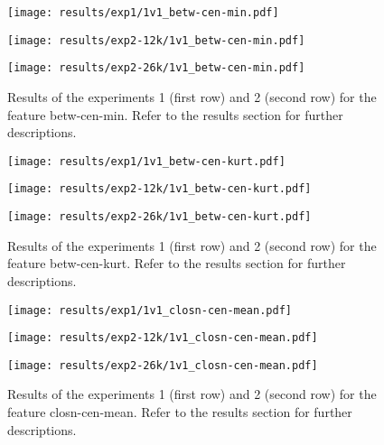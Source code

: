 \begin{figure}[h!]
	\centering
	\begin{minipage}{0.4\linewidth}
		\texttt{[image: results/exp1/1v1\_betw-cen-min.pdf]}
	\end{minipage}
	
	\begin{minipage}{0.4\linewidth}
		\texttt{[image: results/exp2-12k/1v1\_betw-cen-min.pdf]}
	\end{minipage}
	\begin{minipage}{0.4\linewidth}
		\texttt{[image: results/exp2-26k/1v1\_betw-cen-min.pdf]}
	\end{minipage}
	
	\caption[ Results: Feature betw-cen-min]{ Results of the experiments 1 (first row) and 2 (second row) for the feature betw-cen-min. Refer to the results section for further descriptions. }
	\label{fig:appendix_betw-cen-min}
\end{figure}
\newpage 


\begin{figure}[h!]
	\centering
	\begin{minipage}{0.4\linewidth}
		\texttt{[image: results/exp1/1v1\_betw-cen-kurt.pdf]}
	\end{minipage}
	
	\begin{minipage}{0.4\linewidth}
		\texttt{[image: results/exp2-12k/1v1\_betw-cen-kurt.pdf]}
	\end{minipage}
	\begin{minipage}{0.4\linewidth}
		\texttt{[image: results/exp2-26k/1v1\_betw-cen-kurt.pdf]}
	\end{minipage}
	
	\caption[ Results: Feature betw-cen-kurt]{ Results of the experiments 1 (first row) and 2 (second row) for the feature betw-cen-kurt. Refer to the results section for further descriptions. }
	\label{fig:appendix_betw-cen-kurt}
\end{figure}

\begin{figure}[h!]
	\centering
	\begin{minipage}{0.4\linewidth}
		\texttt{[image: results/exp1/1v1\_closn-cen-mean.pdf]}
	\end{minipage}
	
	\begin{minipage}{0.4\linewidth}
		\texttt{[image: results/exp2-12k/1v1\_closn-cen-mean.pdf]}
	\end{minipage}
	\begin{minipage}{0.4\linewidth}
		\texttt{[image: results/exp2-26k/1v1\_closn-cen-mean.pdf]}
	\end{minipage}
	
	\caption[ Results: Feature closn-cen-mean]{ Results of the experiments 1 (first row) and 2 (second row) for the feature closn-cen-mean. Refer to the results section for further descriptions. }
	\label{fig:appendix_closn-cen-mean}
\end{figure}
\newpage 


